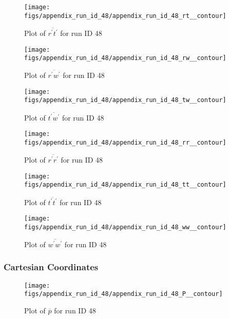 \begin{figure}[H]
\centering
\texttt{[image: figs/appendix\_run\_id\_48/appendix\_run\_id\_48\_rt\_\_contour]}
\caption{Plot of $\overline{r^\prime t^\prime}$ for run ID 48}
\label{fig:appendix_run_id_48_rt__contour}
\end{figure}


\begin{figure}[H]
\centering
\texttt{[image: figs/appendix\_run\_id\_48/appendix\_run\_id\_48\_rw\_\_contour]}
\caption{Plot of $\overline{r^\prime w^\prime}$ for run ID 48}
\label{fig:appendix_run_id_48_rw__contour}
\end{figure}


\begin{figure}[H]
\centering
\texttt{[image: figs/appendix\_run\_id\_48/appendix\_run\_id\_48\_tw\_\_contour]}
\caption{Plot of $\overline{t^\prime w^\prime}$ for run ID 48}
\label{fig:appendix_run_id_48_tw__contour}
\end{figure}


\begin{figure}[H]
\centering
\texttt{[image: figs/appendix\_run\_id\_48/appendix\_run\_id\_48\_rr\_\_contour]}
\caption{Plot of $\overline{r^\prime r^\prime}$ for run ID 48}
\label{fig:appendix_run_id_48_rr__contour}
\end{figure}


\begin{figure}[H]
\centering
\texttt{[image: figs/appendix\_run\_id\_48/appendix\_run\_id\_48\_tt\_\_contour]}
\caption{Plot of $\overline{t^\prime t^\prime}$ for run ID 48}
\label{fig:appendix_run_id_48_tt__contour}
\end{figure}


\begin{figure}[H]
\centering
\texttt{[image: figs/appendix\_run\_id\_48/appendix\_run\_id\_48\_ww\_\_contour]}
\caption{Plot of $\overline{w^\prime w^\prime}$ for run ID 48}
\label{fig:appendix_run_id_48_ww__contour}
\end{figure}


\subsubsection{Cartesian Coordinates}
\begin{figure}[H]
\centering
\texttt{[image: figs/appendix\_run\_id\_48/appendix\_run\_id\_48\_P\_\_contour]}
\caption{Plot of $\overline{p}$ for run ID 48}
\label{fig:appendix_run_id_48_P__contour}
\end{figure}


